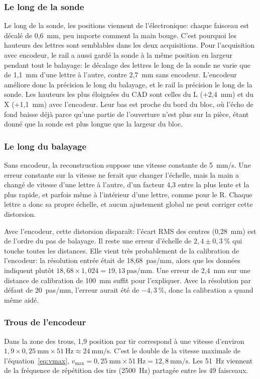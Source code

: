 \documentclass[11pt,letterpaper]{article}
\begin{document}
\subsubsection*{Le long de la sonde}
Le long de la sonde, les positions viennent de l'électronique: chaque faisceau est décalé de 0,6~mm, peu importe comment la main bouge. C'est pourquoi les hauteurs des lettres sont semblables dans les deux acquisitions. Pour l'acquisition avec encodeur, le rail a aussi gardé la sonde à la même position en largeur pendant tout le balayage: le décalage des lettres le long de la sonde ne varie que de 1,1~mm d'une lettre à l'autre, contre 2,7~mm sans encodeur. L'encodeur améliore donc la précision le long du balayage, et le rail la précision le long de la sonde. Les hauteurs les plus éloignées du CAD sont celles du L (+2,4~mm) et du X (+1,1~mm) avec l'encodeur. Leur bas est proche du bord du bloc, où l'écho de fond baisse déjà parce qu'une partie de l'ouverture n'est plus sur la pièce, étant donné que la sonde est plus longue que la largeur du bloc.

\subsubsection*{Le long du balayage}
Sans encodeur, la reconstruction suppose une vitesse constante de 5~mm/s. Une erreur constante sur la vitesse ne ferait que changer l'échelle, mais la main a changé de vitesse d'une lettre à l'autre, d'un facteur 4,3 entre la plus lente et la plus rapide, et parfois même à l'intérieur d'une lettre, comme pour le R. Chaque lettre a donc sa propre échelle, et aucun ajustement global ne peut corriger cette distorsion.

Avec l'encodeur, cette distorsion disparaît: l'écart RMS des centres (0,28~mm) est de l'ordre du pas de balayage. Il reste une erreur d'échelle de $2{,}4 \pm 0{,}3~\%$ qui touche toutes les distances. Elle vient très probablement de la calibration de l'encodeur: la résolution entrée était de 18,68~pas/mm, alors que les données indiquent plutôt $18{,}68 \times 1{,}024 = 19{,}13~\text{pas/mm}$. Une erreur de 2,4~mm sur une distance de calibration de 100~mm suffit pour l'expliquer. Avec la résolution par défaut de 20~pas/mm, l'erreur aurait été de $-4{,}3~\%$, donc la calibration a quand même aidé.

\subsubsection*{Trous de l'encodeur}
Dans la zone des trous, 1,9 position par tir correspond à une vitesse d'environ $1{,}9 \times 0{,}25~\text{mm} \times 51~\text{Hz} \approx 24~\text{mm/s}$. C'est le double de la vitesse maximale de l'équation~\ref{eq:vmax}, $v_{\max} = 0{,}25~\text{mm} \times 51~\text{Hz} = 12{,}8~\text{mm/s}$. Les 51~Hz viennent de la fréquence de répétition des tirs (2500~Hz) partagée entre les 49 faisceaux.
\end{document}

